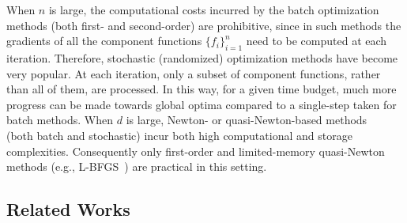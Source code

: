 \documentclass[10pt,twocolumn,journal]{IEEEtran}
\begin{document}
When $n$ is large, the computational costs incurred by the batch optimization methods (both first- and second-order) are prohibitive, since in such methods the gradients of all the component functions $\{f_i\}_{i=1}^n$ need to be computed at each iteration. Therefore, stochastic (randomized) optimization  methods have become very popular. At each iteration, only a subset of component functions, rather than all of them, are processed. %
In this way, for a given time budget, much more progress can be made towards global optima compared to a single-step taken for batch methods.
When $d$ is large, Newton- or quasi-Newton-based methods ~%
(both batch and stochastic)
 incur both high computational and storage complexities. %
Consequently only first-order and limited-memory quasi-Newton methods (e.g., L-BFGS~\cite{Liu_89}) are practical in this setting. 

\subsection{Related Works}\label{sec:lit}
\end{document}

